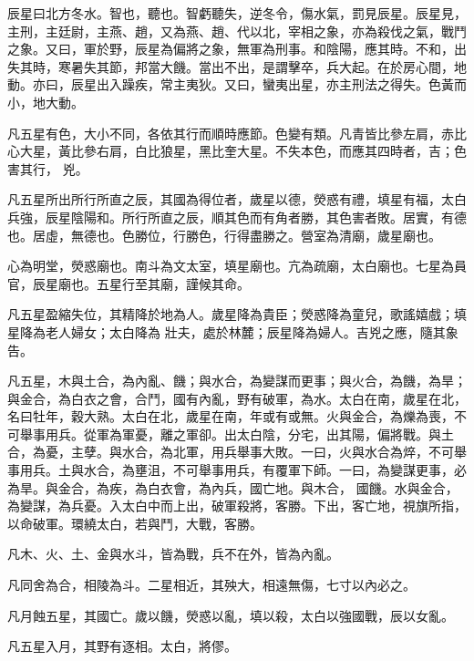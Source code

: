 \begin{pinyinscope}
 辰星曰北方冬水。智也，聽也。智虧聽失，逆冬令，傷水氣，罰見辰星。辰星見，主刑，主廷尉，主燕、趙，又為燕、趙、代以北，宰相之象，亦為殺伐之氣，戰鬥之象。又曰，軍於野，辰星為偏將之象，無軍為刑事。和陰陽，應其時。不和，出失其時，寒暑失其節，邦當大饑。當出不出，是謂擊卒，兵大起。在於房心間，地動。亦曰，辰星出入躁疾，常主夷狄。又曰，蠻夷出星，亦主刑法之得失。色黃而小，地大動。



 凡五星有色，大小不同，各依其行而順時應節。色變有類。凡青皆比參左肩，赤比心大星，黃比參右肩，白比狼星，黑比奎大星。不失本色，而應其四時者，吉；色害其行，
 兇。



 凡五星所出所行所直之辰，其國為得位者，歲星以德，熒惑有禮，填星有福，太白兵強，辰星陰陽和。所行所直之辰，順其色而有角者勝，其色害者敗。居實，有德也。居虛，無德也。色勝位，行勝色，行得盡勝之。營室為清廟，歲星廟也。



 心為明堂，熒惑廟也。南斗為文太室，填星廟也。亢為疏廟，太白廟也。七星為員官，辰星廟也。五星行至其廟，謹候其命。



 凡五星盈縮失位，其精降於地為人。歲星降為貴臣；熒惑降為童兒，歌謠嬉戲；填星降為老人婦女；太白降為
 壯夫，處於林麓；辰星降為婦人。吉兇之應，隨其象告。



 凡五星，木與土合，為內亂、饑；與水合，為變謀而更事；與火合，為饑，為旱；與金合，為白衣之會，合鬥，國有內亂，野有破軍，為水。太白在南，歲星在北，名曰牡年，穀大熟。太白在北，歲星在南，年或有或無。火與金合，為爍為喪，不可舉事用兵。從軍為軍憂，離之軍卻。出太白陰，分宅，出其陽，偏將戰。與土合，為憂，主孽。與水合，為北軍，用兵舉事大敗。一曰，火與水合為焠，不可舉事用兵。土與水合，為壅沮，不可舉事用兵，有覆軍下師。一曰，為變謀更事，必為旱。與金合，為疾，為白衣會，為內兵，國亡地。與木合，
 國饑。水與金合，為變謀，為兵憂。入太白中而上出，破軍殺將，客勝。下出，客亡地，視旗所指，以命破軍。環繞太白，若與鬥，大戰，客勝。



 凡木、火、土、金與水斗，皆為戰，兵不在外，皆為內亂。



 凡同舍為合，相陵為斗。二星相近，其殃大，相遠無傷，七寸以內必之。



 凡月蝕五星，其國亡。歲以饑，熒惑以亂，填以殺，太白以強國戰，辰以女亂。



 凡五星入月，其野有逐相。太白，將僇。




\end{pinyinscope}
